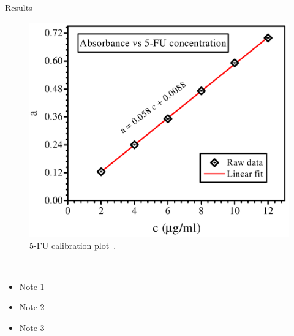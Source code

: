 \documentclass[20pt]{beamer}
\begin{document}
\begin{frame}[t]
\begin{columns}[t]
\begin{column}{0.32\linewidth}
\begin{block}{Results}
\begin{minipage}[t]{0.4\linewidth}
	\begin{figure}
		\includegraphics[width=\linewidth]{res1}
		\caption{5-FU calibration plot~\cite{hasc18}.}
	\end{figure} 
\end{minipage} 
~
\begin{minipage}[t]{0.35\linewidth}
	\begin{itemize}
		\item Note 1
		\item Note 2
		\item Note 3	
	\end{itemize}
\end{minipage} 		

\vspace{1cm}


\end{block}
\end{column}
\end{columns}
\end{frame}
\end{document}
